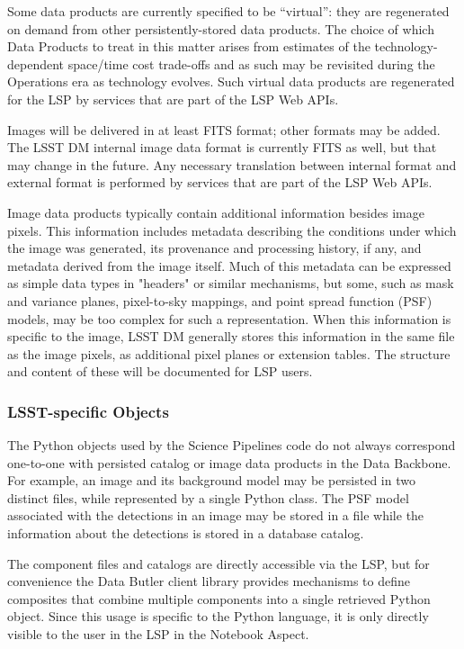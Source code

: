 Some data products are currently specified to be ``virtual'': they are
regenerated on demand from other persistently-stored data products.
The choice of which Data Products to treat in this matter arises from
estimates of the technology-dependent space/time cost trade-offs and as
such may be revisited during the Operations era as technology evolves.
Such virtual data products are regenerated for the LSP by services that are
part of the LSP Web APIs.

Images will be delivered in at least FITS format; other formats may be added.
The LSST DM internal image data format is currently FITS as well, but that may
change in the future.  Any necessary translation between internal format and
external format is performed by services that are part of the LSP Web APIs.

Image data products typically contain additional information besides image
pixels.  This information includes metadata describing the conditions under
which the image was generated, its provenance and processing history, if any,
and metadata derived from the image itself.  Much of this metadata can be
expressed as simple data types in "headers" or similar mechanisms, but some,
such as mask and variance planes, pixel-to-sky mappings, and point spread
function (PSF) models, may be too complex for such a representation.  When this
information is specific to the image, LSST DM generally stores this information
in the same file as the image pixels, as additional pixel planes or extension
tables.  The structure and content of these will be documented for LSP users.

\subsubsection{LSST-specific Objects}\label{lsst-specific-objects}

The Python objects used by the Science Pipelines code do not always
correspond one-to-one with persisted catalog or image data products in the
Data Backbone.
For example, an image and its background model may be persisted
in two distinct files, while represented by a single Python class.
The PSF model associated with the detections in an
image may be stored in a file while the information about the detections is
stored in a database catalog.

The component files and catalogs are directly accessible via the LSP, but
for convenience the Data Butler client library provides mechanisms to define
composites that combine multiple components into a single retrieved Python
object.  Since this usage is specific to the Python language, it is only
directly visible to the user in the LSP in the Notebook Aspect.

